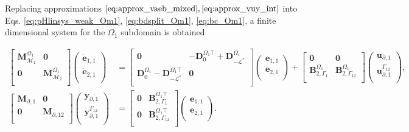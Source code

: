 Replacing approximations $\ref{eq:approx_vaeb_mixed}, \ref{eq:approx_vuy_int}$ into Eqs. \ref{eq:pHlinsys_weak_Om1}, \ref{eq:bdsplit_Om1}, \ref{eq:bc_Om1}, a finite dimensional system for the $\Omega_1$ subdomain is obtained


\begin{equation}\label{eq:pHlinsys_findim_Om1}
\begin{aligned}
\begin{bmatrix}
\mathbf{M}_{\mathcal{M}_1}^{\Omega_1} & \mathbf{0} \\
\mathbf{0} & \mathbf{M}_{\mathcal{M}_2}^{\Omega_1} \\
\end{bmatrix}
\begin{pmatrix}
\dot{\mathbf{e}}_{1, 1} \\
\dot{\mathbf{e}}_{2, 1} \\
\end{pmatrix}
&= \begin{bmatrix}
\mathbf{0} & -\mathbf{D}_{0}^{\Omega_1 \top}+ \mathbf{D}_{-\mathcal{L}^*}^{\Omega_1} \\
\mathbf{D}_{0}^{\Omega_1} - \mathbf{D}_{-\mathcal{L}^*}^{\Omega_1 \top} & \mathbf{0} \\
\end{bmatrix} 
\begin{pmatrix}
\mathbf{e}_{1, 1} \\
\mathbf{e}_{2, 1} \\
\end{pmatrix} + 
\begin{bmatrix}
\mathbf{0} & \mathbf{0}\\
\mathbf{B}_{2, \Gamma_1}^{\Omega_1} & \mathbf{B}_{2, \Gamma_{12}}^{\Omega_1}\\
\end{bmatrix}
\begin{pmatrix}
\mathbf{u}_{\partial, 1} \\
\mathbf{u}_{\partial, 1}^{\Gamma_{12}} \\
\end{pmatrix}, \\
\begin{bmatrix}
\mathbf{M}_{\partial, 1} & \mathbf{0}  \\
\mathbf{0} & \mathbf{M}_{\partial, 12} \\
\end{bmatrix}
\begin{pmatrix}
\mathbf{y}_{\partial, 1} \\
\mathbf{y}_{\partial, 1}^{\Gamma_{12}} \\
\end{pmatrix}
  &= 
\begin{bmatrix}
\mathbf{0} & \mathbf{B}_{2, \Gamma_1}^{\Omega_1 \top}\\
\mathbf{0} & \mathbf{B}_{2, \Gamma_{12}}^{\Omega_1 \top} \\
\end{bmatrix}\begin{pmatrix}
\mathbf{e}_{1, 1} \\
\mathbf{e}_{2, 1} \\
\end{pmatrix}.
\end{aligned}
\end{equation}
